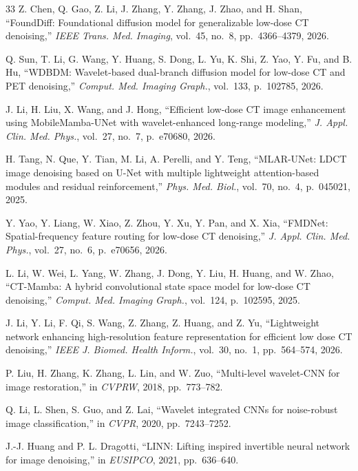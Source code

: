 \documentclass[conference]{IEEEtran}
\begin{document}
\begin{thebibliography}{33}
 Z. Chen, Q. Gao, Z. Li, J. Zhang, Y. Zhang,
J. Zhao, and H. Shan, ``FoundDiff: Foundational diffusion model for
generalizable low-dose CT denoising,'' \emph{IEEE Trans. Med. Imaging},
vol.~45, no.~8, pp.~4366--4379, 2026.

 Q. Sun, T. Li, G. Wang, Y. Huang, S. Dong, L. Yu,
K. Shi, Z. Yao, Y. Fu, and B. Hu, ``WDBDM: Wavelet-based dual-branch diffusion
model for low-dose CT and PET denoising,'' \emph{Comput. Med. Imaging Graph.},
vol.~133, p.~102785, 2026.

 J. Li, H. Liu, X. Wang, and J. Hong,
``Efficient low-dose CT image enhancement using MobileMamba-UNet with
wavelet-enhanced long-range modeling,'' \emph{J. Appl. Clin. Med. Phys.},
vol.~27, no.~7, p.~e70680, 2026.

 H. Tang, N. Que, Y. Tian, M. Li, A. Perelli, and
Y. Teng, ``MLAR-UNet: LDCT image denoising based on U-Net with multiple
lightweight attention-based modules and residual reinforcement,'' \emph{Phys.
Med. Biol.}, vol.~70, no.~4, p.~045021, 2025.

 Y. Yao, Y. Liang, W. Xiao, Z. Zhou, Y. Xu, Y. Pan, and
X. Xia, ``FMDNet: Spatial-frequency feature routing for low-dose CT denoising,''
\emph{J. Appl. Clin. Med. Phys.}, vol.~27, no.~6, p.~e70656, 2026.

 L. Li, W. Wei, L. Yang, W. Zhang, J. Dong, Y. Liu,
H. Huang, and W. Zhao, ``CT-Mamba: A hybrid convolutional state space model for
low-dose CT denoising,'' \emph{Comput. Med. Imaging Graph.}, vol.~124,
p.~102595, 2025.

 J. Li, Y. Li, F. Qi, S. Wang, Z. Zhang, Z. Huang, and
Z. Yu, ``Lightweight network enhancing high-resolution feature representation
for efficient low dose CT denoising,'' \emph{IEEE J. Biomed. Health Inform.},
vol.~30, no.~1, pp.~564--574, 2026.

 P. Liu, H. Zhang, K. Zhang, L. Lin, and W. Zuo,
``Multi-level wavelet-CNN for image restoration,'' in \emph{CVPRW}, 2018,
pp.~773--782.

 Q. Li, L. Shen, S. Guo, and Z. Lai, ``Wavelet
integrated CNNs for noise-robust image classification,'' in \emph{CVPR}, 2020,
pp.~7243--7252.

 J.-J. Huang and P. L. Dragotti, ``LINN: Lifting inspired
invertible neural network for image denoising,'' in \emph{EUSIPCO}, 2021,
pp.~636--640.


\end{thebibliography}
\end{document}
